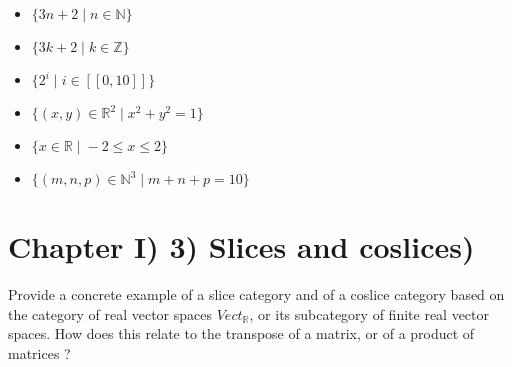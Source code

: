 \documentclass[12pt, letterpaper, twoside]{report}
\begin{document}
\begin{itemize}
	\item $\{3n + 2 \; | \; n \in \mathbb{N} \}$
	\item $\{3k + 2 \; | \; k \in \mathbb{Z} \}$
	\item $\{ 2^i \; | \; i \in [[0, 10]] \}$
	\item $\{ (x, y) \in \mathbb{R}^2 \; | \; x^2 + y^2 = 1 \}$
	\item $\{ x \in \mathbb{R} \; | \; -2 \leq x \leq 2 \}$
	\item $\{ (m, n, p) \in \mathbb{N}^3 \; | \; m + n + p = 10 \}$
\end{itemize}



\section*{Chapter I) 3) Slices and coslices)}

Provide a concrete example of a slice category and of a coslice category based on the category of real vector spaces $Vect_{\mathbb{R}}$, or its subcategory of finite real vector spaces.
How does this relate to the transpose of a matrix, or of a product of matrices ?

\newpage
\end{document}
